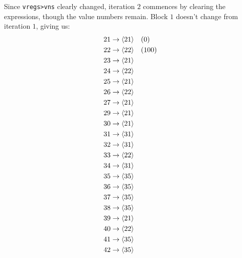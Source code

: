 Since \Verb|vregs>vns| clearly changed, iteration $2$ commences by clearing
the expressions, though the value numbers remain.  Block $1$ doesn't change
from iteration $1$, giving us:
%
\begin{align*}
  21 &\to \langle 21\rangle \quad (0)                 \\
  22 &\to \langle 22\rangle \quad (100)               \\
  23 &\to \langle 21\rangle                           \\
  24 &\to \langle 22\rangle                           \\
  25 &\to \langle 21\rangle                           \\
  26 &\to \langle 22\rangle                           \\
  27 &\to \langle 21\rangle                           \\
  29 &\to \langle 21\rangle                           \\
  30 &\to \langle 21\rangle                           \\
  31 &\to \langle 31\rangle                           \\
  32 &\to \langle 31\rangle                           \\
  33 &\to \langle 22\rangle                           \\
  34 &\to \langle 31\rangle                           \\
  35 &\to \langle 35\rangle                           \\
  36 &\to \langle 35\rangle                           \\
  37 &\to \langle 35\rangle                           \\
  38 &\to \langle 35\rangle                           \\
  39 &\to \langle 21\rangle                           \\
  40 &\to \langle 22\rangle                           \\
  41 &\to \langle 35\rangle                           \\
  42 &\to \langle 35\rangle
\end{align*}

